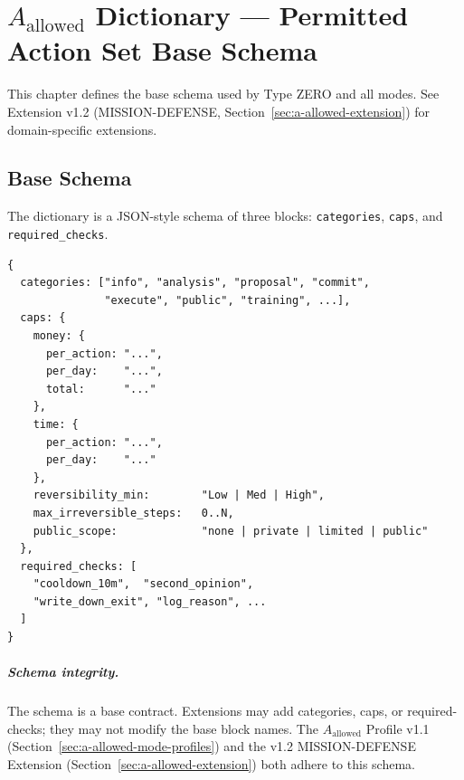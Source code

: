 
\chapter{$A_{\mathrm{allowed}}$ Dictionary --- Permitted Action Set
Base Schema}
\label{ch:a-allowed-dictionary}


This chapter defines the base schema used by Type ZERO and all
modes. See Extension v1.2 (MISSION-DEFENSE,
Section~\ref{sec:a-allowed-extension}) for domain-specific
extensions.

\section{Base Schema}
\label{sec:a-allowed-dict-schema}

The dictionary is a JSON-style schema of three blocks:
\texttt{categories}, \texttt{caps}, and \texttt{required\_checks}.

\begin{lstlisting}[basicstyle=\ttfamily\small,frame=single]
{
  categories: ["info", "analysis", "proposal", "commit",
               "execute", "public", "training", ...],
  caps: {
    money: {
      per_action: "...",
      per_day:    "...",
      total:      "..."
    },
    time: {
      per_action: "...",
      per_day:    "..."
    },
    reversibility_min:        "Low | Med | High",
    max_irreversible_steps:   0..N,
    public_scope:             "none | private | limited | public"
  },
  required_checks: [
    "cooldown_10m",  "second_opinion",
    "write_down_exit", "log_reason", ...
  ]
}
\end{lstlisting}

\paragraph{Schema integrity.}
The schema is a base contract. Extensions may add categories, caps,
or required-checks; they may not modify the base block names. The
$A_{\mathrm{allowed}}$ Profile v1.1 (Section~\ref{sec:a-allowed-mode-profiles})
and the v1.2 MISSION-DEFENSE Extension
(Section~\ref{sec:a-allowed-extension}) both adhere to this schema.


